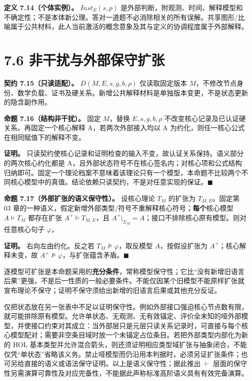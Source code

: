 \documentclass[UTF8,a4paper,zihao=-4,fontset=windows,openany]{ctexbook}
\newcommand{\mcsdisplay}[1]{%
  \par\addvspace{0.7em}%
  \sbox{\mcsmathbox}{\ensuremath{\displaystyle #1}}%
  \ifdim\wd\mcsmathbox>\linewidth
    \noindent\resizebox{\linewidth}{!}{\usebox{\mcsmathbox}}%
  \else
    \noindent\hspace*{\fill}\usebox{\mcsmathbox}\hspace*{\fill}%
  \fi
  \par\addvspace{0.7em}%
}
\def\ensuremath#1{#1}%
\def\operatorname#1{#1}%
\begin{document}
\textbf{定义 7.14（个体实例）。} \(\operatorname{Inst}_E(s,p)\) 是外部判断，附观测、时间、解释模型和不确定性；不是本体新公理。答对一道题不必消除相关的所有误解。共享图形/比喻属于公共材料，此人当前激活的概念意象及其与定义的协调程度属于外部解释。

\section{7.6 非干扰与外部保守扩张}
\textbf{契约 7.15（只读适配）。} \(D(M,E,s,g,b,\rho)\) 仅读取固定版本 \(M\)，不修改节点身份、数学负载、证书及硬关系。新增公共解释材料是单独版本变更，不是状态更新的隐含副作用。

\textbf{命题 7.16（结构非干扰）。} 固定 \(M\)，替换 \(E,s,g,b,\rho\) 不改变核心记录及已认证硬关系。再固定一个核心解释 A，若两次外部接入均以 A 为约化，则任一核心公式在相同赋值下的解释不变。

\textbf{证明。} 只读契约使核心记录和证明检查的输入不变，故认证关系保持。语义部分的两次核心约化都是 A，且外部状态符号不在核心签名内；对核心项和公式结构归纳即可。固定一个理论档案不意味着该理论只有一个模型，本命题不比较两个不同核心模型中的真值。结论依赖只读契约，不是对任意实现的保证。\(\blacksquare\)

\textbf{命题 7.17（外部扩张的语义保守性）。} 设核心理论 \(T_M\) 的扩张为 \(T_{M,E}\)。固定第 03 章的一种语义，假定新增外部类型/符号不重解释核心符号；\textbf{每个}核心模型 \(A\models T_M\) 都存在扩张 \(A^+\models T_{M,E}\)，且 \(A^+|_{\Sigma_M}=A\)；接口不排除核心原有模型。则对任意核心句子 \(\varphi\)，


\mcsdisplay{T_{M,E}\models\varphi\quad\Longleftrightarrow\quad T_M\models\varphi.}
\noindent \textbf{证明。} 右向左由约化。反之若 \(T_M\not\models\varphi\)，取反模型 \(A\)，按假设扩张为 \(A^+\)；核心解释未变，故 \(A^+\not\models\varphi\)，与扩张蕴含矛盾。\(\blacksquare\)

逐模型可扩张是本命题采用的\textbf{充分条件}，常称模型保守性；它比“没有新增旧语言后果”更强，不是后一性质的一般必要条件。不能仅因某个旧模型不能原样扩张就宣布理论不保守；证明不保守须给出新增的旧语言后果或其他充分反证。

仅把状态放在另一张表中不足以证明保守性。例如外部接口强迫核心节点数有限，就可能排除原有模型。允许单状态、无观测、无有效锚定、评价全未知的哑外部模型，并使接口约束对其成立：当外部层只是元层只读关系记录时，可直接与每个核心模型配对；需要非空条目域时放一个未锚定占位条目。若把外部类型内部化为新的 HOL 基本类型并允许混合箭头，则还须证明相应类型域扩张与抽象闭合，不能仅凭“单状态”省略该义务。禁止哑模型而仍沿用本判据时，必须另证扩张条件；也可另给直接的语义或语法保守证明。以上是语义保守性；据此推出 \(\vdash\) 层面的保守性另需演算可靠性及对应完备性，不能据此声称标准高阶语义具有有效完备演算。
\end{document}

